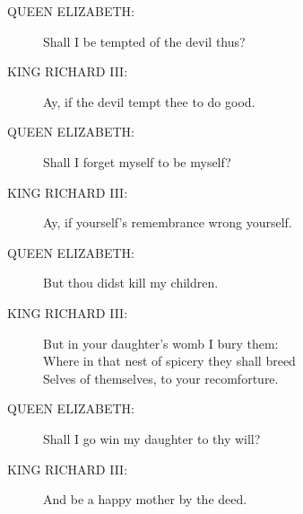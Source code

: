 \documentclass{article}
\begin{document}
\begin{description}
\item[QUEEN ELIZABETH:] 
\hspace{1pt}Shall I be tempted of the devil thus?\\
\end{description}
\begin{description}
\item[KING RICHARD III:] 
\hspace{1pt}Ay, if the devil tempt thee to do good.\\
\end{description}
\begin{description}
\item[QUEEN ELIZABETH:] 
\hspace{1pt}Shall I forget myself to be myself?\\
\end{description}
\begin{description}
\item[KING RICHARD III:] 
\hspace{1pt}Ay, if yourself's remembrance wrong yourself.\\
\end{description}
\begin{description}
\item[QUEEN ELIZABETH:] 
\hspace{1pt}But thou didst kill my children.\\
\end{description}
\begin{description}
\item[KING RICHARD III:] 
\hspace{1pt}But in your daughter's womb I bury them:\\
\hspace{1pt}Where in that nest of spicery they shall breed\\
\hspace{1pt}Selves of themselves, to your recomforture.\\
\end{description}
\begin{description}
\item[QUEEN ELIZABETH:] 
\hspace{1pt}Shall I go win my daughter to thy will?\\
\end{description}
\begin{description}
\item[KING RICHARD III:] 
\hspace{1pt}And be a happy mother by the deed.\\
\end{description}
\end{document}
